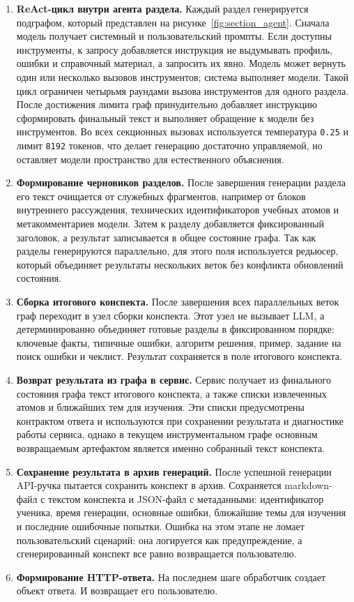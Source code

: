 \documentclass[a4paper,12pt]{extarticle}
\begin{document}
\begin{enumerate}
    \item \textbf{ReAct-цикл внутри агента раздела.} Каждый раздел генерируется
	подграфом, который представлен на рисунке~\ref{fig:section_agent}. Сначала модель получает системный и
	пользовательский промпты. Если доступны инструменты, к запросу добавляется
	инструкция не выдумывать профиль, ошибки и справочный материал, а запросить
	их явно. Модель может вернуть один или несколько вызовов инструментов; система выполняет
	модели. Такой цикл ограничен четырьмя раундами вызова инструментов для одного
	раздела. После достижения лимита граф принудительно добавляет инструкцию
	сформировать финальный текст и выполняет обращение к модели без инструментов.
	Во всех секционных вызовах используется температура \texttt{0.25} и лимит
	\texttt{8192} токенов, что делает генерацию достаточно управляемой, но
	оставляет модели пространство для естественного объяснения.
    \item \textbf{Формирование черновиков разделов.} После завершения генерации
	раздела его текст очищается от служебных фрагментов, например от блоков
	внутреннего рассуждения, технических идентификаторов учебных атомов и
	метакомментариев модели. Затем
	к разделу добавляется фиксированный заголовок, а результат записывается в
	общее состояние графа. Так как разделы
	генерируются параллельно, для этого поля используется редьюсер, который
	объединяет результаты нескольких веток без конфликта обновлений состояния.
    \item \textbf{Сборка итогового конспекта.} После завершения всех параллельных
	веток граф переходит в узел сборки конспекта. Этот узел не вызывает
	LLM, а детерминированно объединяет готовые разделы в фиксированном порядке:
	ключевые факты, типичные ошибки, алгоритм решения, пример, задание на поиск
	ошибки и чеклист. Результат сохраняется в поле итогового конспекта.
    \item \textbf{Возврат результата из графа в сервис.} Сервис получает из
	финального состояния графа текст итогового конспекта, а также списки
	извлеченных атомов и ближайших тем для изучения. Эти списки предусмотрены
	контрактом ответа и используются при сохранении результата и диагностике
	работы сервиса, однако в текущем инструментальном графе основным возвращаемым
	артефактом является именно собранный текст конспекта.
    \item \textbf{Сохранение результата в архив генераций.} После успешной генерации
	API-ручка пытается сохранить конспект в архив. Сохраняется markdown-файл
	с текстом конспекта и JSON-файл с метаданными: идентификатор ученика, время
	генерации, основные ошибки, ближайшие темы для изучения и последние ошибочные
	попытки. Ошибка на этом этапе не ломает пользовательский сценарий: она
	логируется как предупреждение, а сгенерированный конспект все равно
	возвращается пользователю.
    \item \textbf{Формирование HTTP-ответа.} На последнем шаге обработчик создает
	объект ответа. И возвращает его пользователю.
\end{enumerate}
\end{document}
